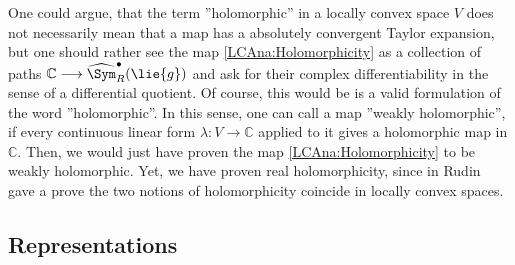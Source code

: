 \begin{remark}
	\label{LCAna:Rem:Holomorphicity}
	One could argue, that the term ''holomorphic'' in a locally convex space 
	$V$ does not necessarily mean that a map has a absolutely convergent 
	Taylor expansion, but one should rather see the map 
	\eqref{LCAna:Holomorphicity} as a collection of paths $\mathbb{C} 
	\longrightarrow \widehat{\Sym}_R^{\bullet}(\lie{g})$ and ask for their 
	complex differentiability in the sense of a differential quotient. Of 
	course, this would be is a valid formulation of the word ''holomorphic''. 
	In this sense, one can call a map ''weakly holomorphic'', if every 
	continuous linear form $\lambda \colon V \longrightarrow \mathbb{C}$
	applied to it gives a holomorphic map in $\mathbb{C}$. Then, we would just 
	have proven the map \eqref{LCAna:Holomorphicity} to be weakly holomorphic.
	Yet, we have proven real holomorphicity, since in \cite{Rudin:blue} Rudin 
	gave a prove the two notions of holomorphicity coincide in locally convex 
	spaces.
\end{remark}



\subsection{Representations}

